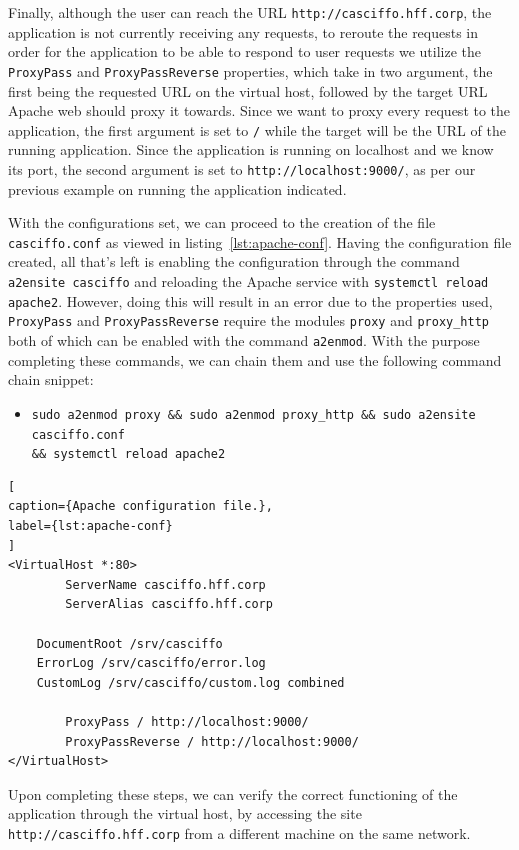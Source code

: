 Finally, although the user can reach the URL \lstinline[keywordstyle=\color{black},commentstyle=\color{black},stringstyle=\color{black}]{http://casciffo.hff.corp}, 
the application is not currently receiving any requests, to reroute the requests in order for the application to be able to respond to user requests we utilize the \lstinline{ProxyPass} and \lstinline{ProxyPassReverse} properties, which take in two argument, the first being the requested URL on the virtual host, followed by the target URL Apache web should proxy it towards. Since we want to proxy every request to the application, the first argument is set to \lstinline[keywordstyle=\color{black},commentstyle=\color{black},stringstyle=\color{black}]{/} while the target will be the URL of the running application.
Since the application is running on localhost and we know its port, the second argument is set to \lstinline[keywordstyle=\color{black},commentstyle=\color{black},stringstyle=\color{black}]{http://localhost:9000/}, as per our previous example on running the application indicated.

With the configurations set, we can proceed to the creation of the file \lstinline{casciffo.conf} as viewed in listing~\ref{lst:apache-conf}.
Having the configuration file created, all that's left is enabling the configuration through the command \lstinline{a2ensite casciffo} and reloading the Apache service with \lstinline{systemctl reload apache2}. However, doing this will result in an error due to the properties used, \lstinline{ProxyPass} and \lstinline{ProxyPassReverse} require the modules \lstinline{proxy} and \lstinline{proxy_http} both of which can be enabled with the command \lstinline{a2enmod}. With the purpose completing these commands, we can chain them and use the following command chain snippet:

\begin{itemize}
    \item \lstinline[keywordstyle=\color{black},commentstyle=\color{black},stringstyle=\color{black}]{sudo a2enmod proxy && sudo a2enmod proxy_http && sudo a2ensite casciffo.conf}
    \\ \lstinline[keywordstyle=\color{black},commentstyle=\color{black},stringstyle=\color{black}]{&& systemctl reload apache2}
\end{itemize}


\begin{lstlisting}[
caption={Apache configuration file.},
label={lst:apache-conf}
]
<VirtualHost *:80>
        ServerName casciffo.hff.corp
        ServerAlias casciffo.hff.corp

	DocumentRoot /srv/casciffo
	ErrorLog /srv/casciffo/error.log
	CustomLog /srv/casciffo/custom.log combined

        ProxyPass / http://localhost:9000/
        ProxyPassReverse / http://localhost:9000/
</VirtualHost>
\end{lstlisting}

Upon completing these steps, we can verify the correct functioning of the application through the virtual host, by accessing the site \lstinline[keywordstyle=\color{black},commentstyle=\color{black},stringstyle=\color{black}]{http://casciffo.hff.corp} from a different machine on the same network.
